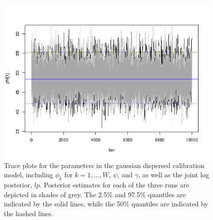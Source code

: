 \begin{figure}
\centering
\includegraphics[width=5in]{figures/cal_trace.png}
%
\caption{Trace plots for the parameters in the gaussian dispersed
  calibration model, including $\phi_k$ for $k=1, \ldots, W$, $\psi$,
  and $\gamma$, as well as the joint log posterior,
  $\textit{lp}$. Posterior estimates for each of the three runs are
  depicted in shades of grey. The 2.5\% and 97.5\% quantiles are
  indicated by the solid lines, while the 50\% quantiles are indicated
  by the hashed lines.}
\label{fig:trace}
\end{figure}


